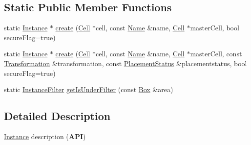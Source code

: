 \subsection*{Static Public Member Functions}
\begin{DoxyCompactItemize}
\item 
static \hyperlink{classHurricane_1_1Instance}{Instance} $\ast$ \hyperlink{classHurricane_1_1Instance_ae130b66536e4536ba8852fb79abfb89e}{create} (\hyperlink{classHurricane_1_1Cell}{Cell} $\ast$cell, const \hyperlink{classHurricane_1_1Name}{Name} \&name, \hyperlink{classHurricane_1_1Cell}{Cell} $\ast$master\-Cell, bool secure\-Flag=true)
\item 
static \hyperlink{classHurricane_1_1Instance}{Instance} $\ast$ \hyperlink{classHurricane_1_1Instance_ad5784305151e45c9d949a74bd85aaa36}{create} (\hyperlink{classHurricane_1_1Cell}{Cell} $\ast$cell, const \hyperlink{classHurricane_1_1Name}{Name} \&name, \hyperlink{classHurricane_1_1Cell}{Cell} $\ast$master\-Cell, const \hyperlink{classHurricane_1_1Transformation}{Transformation} \&transformation, const \hyperlink{classHurricane_1_1Instance_1_1PlacementStatus}{Placement\-Status} \&placementstatus, bool secure\-Flag=true)
\item 
static \hyperlink{namespaceHurricane_a889ec1441e1876d9addf89dfab32e772}{Instance\-Filter} \hyperlink{classHurricane_1_1Instance_ae2bc936dfecfaf70a0052959b4b2861e}{get\-Is\-Under\-Filter} (const \hyperlink{classHurricane_1_1Box}{Box} \&area)
\end{DoxyCompactItemize}


\subsection{Detailed Description}
\hyperlink{classHurricane_1_1Instance}{Instance} description ({\bfseries A\-P\-I}) 

